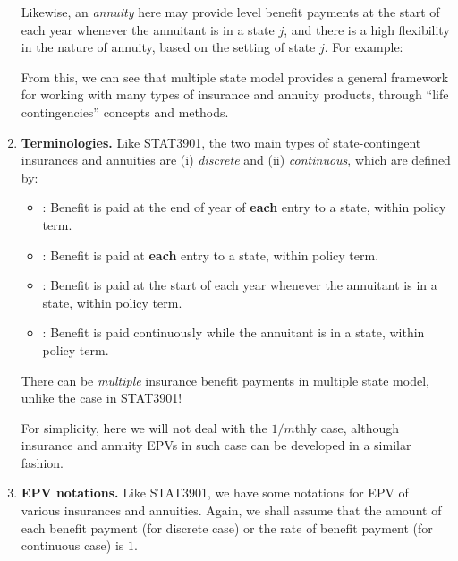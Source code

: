 \begin{enumerate}
Likewise, an \emph{annuity} here may provide level benefit payments at the
start of each year whenever the annuitant is in a state \(j\), and there is a
high flexibility in the nature of annuity, based on the setting of state \(j\).
For example:
From this, we can see that multiple state model provides a general framework for
working with many types of insurance and annuity products, through ``life
contingencies'' concepts and methods.

\item \textbf{Terminologies.} Like STAT3901, the two main types of
state-contingent insurances and annuities are (i) \emph{discrete} and (ii)
\emph{continuous}, which are defined by:
\begin{itemize}
\item {}: Benefit is paid at the end of year of
\textbf{each} entry to a state, within policy term.
\item {}: Benefit is paid at \textbf{each} entry to a state, within policy term.
\item {}: Benefit is paid at the start of each year
whenever the annuitant is in a state, within policy term.
\item {}: Benefit is paid continuously while the
annuitant is in a state, within policy term.
\end{itemize}
\begin{warning}
There can be \emph{multiple} insurance benefit payments in multiple state
model, unlike the case in STAT3901!
\end{warning}

For simplicity, here we will not deal with the \(1/m\)thly case, although
insurance and annuity EPVs in such case can be developed in a similar fashion.

\item \textbf{EPV notations.} Like STAT3901, we have some notations for EPV of
various insurances and annuities. Again, we shall assume that the amount of
each benefit payment (for discrete case) or the rate of benefit payment (for
continuous case) is \(1\).


\end{enumerate}
